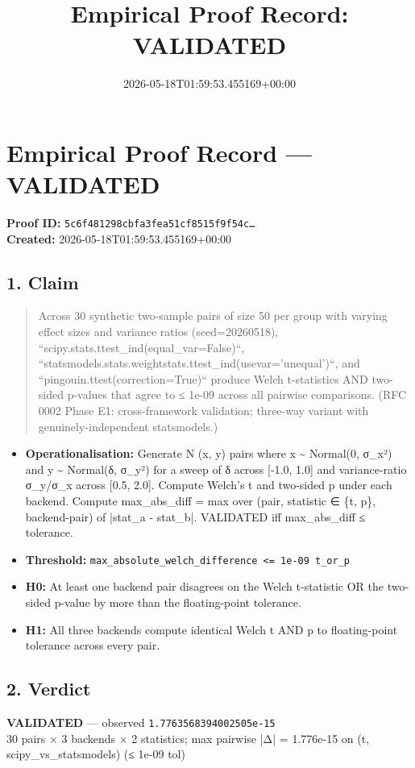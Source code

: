 \documentclass{article}
\title{Empirical Proof Record: VALIDATED}
\date{2026-05-18T01:59:53.455169+00:00}
\begin{document}
\maketitle
\section*{Empirical Proof Record --- \textcolor{validated}{\textbf{VALIDATED}}}
\textbf{Proof ID:} \texttt{5c6f481298cbfa3fea51cf8515f9f54c\dots}\\
\textbf{Created:} 2026-05-18T01:59:53.455169+00:00
\subsection*{1. Claim}
\begin{quote}Across 30 synthetic two-sample pairs of size 50 per group with varying effect sizes and variance ratios (seed=20260518), ``scipy.stats.ttest\_ind(equal\_var=False)``, ``statsmodels.stats.weightstats.ttest\_ind(usevar='unequal')``, and ``pingouin.ttest(correction=True)`` produce Welch t-statistics AND two-sided p-values that agree to ≤ 1e-09 across all pairwise comparisons. (RFC 0002 Phase E1: cross-framework validation; three-way variant with genuinely-independent statsmodels.)\end{quote}
\begin{itemize}
\item \textbf{Operationalisation:} Generate N (x, y) pairs where x \textasciitilde{} Normal(0, σ\_x²) and y \textasciitilde{} Normal(δ, σ\_y²) for a sweep of δ across [-1.0, 1.0] and variance-ratio σ\_y/σ\_x across [0.5, 2.0]. Compute Welch's t and two-sided p under each backend. Compute max\_abs\_diff = max over (pair, statistic ∈ \{t, p\}, backend-pair) of |stat\_a - stat\_b|. VALIDATED iff max\_abs\_diff ≤ tolerance.
\item \textbf{Threshold:} \texttt{max\_absolute\_welch\_difference <= 1e-09 t\_or\_p}
\item \textbf{H0:} At least one backend pair disagrees on the Welch t-statistic OR the two-sided p-value by more than the floating-point tolerance.
\item \textbf{H1:} All three backends compute identical Welch t AND p to floating-point tolerance across every pair.
\end{itemize}
\subsection*{2. Verdict}
\textcolor{validated}{\textbf{VALIDATED}} --- observed \texttt{1.7763568394002505e-15}\\
30 pairs × 3 backends × 2 statistics; max pairwise |Δ| = 1.776e-15 on (t, scipy\_vs\_statsmodels) (≤ 1e-09 tol)
\end{document}
